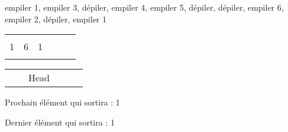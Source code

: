 \documentclass[11pt,a4paper]{article}
\begin{document}
\begin{center}

\begin{large}
empiler 1, empiler 3, dépiler, empiler 4, empiler 5, dépiler, dépiler, empiler 6, empiler 2, dépiler, empiler 1
\end{large}

\medskip

\begin{tabular}{|C{1cm}|C{1cm}|C{1cm}|C{1cm}|C{1cm}|C{1cm}|}
\hline
  &   &   &   &   & \\
1 & 6 & 1 &   &   & \\
  &   &   &   &   & \\
\hline
\end{tabular}

\begin{tabular}{ C{1cm} C{1cm} C{1cm} C{1cm} C{1cm} C{1cm} }
 & & Head & & & \\
\end{tabular}






\begin{table}[ht!]
  \begin{minipage}{0.50\textwidth}

Prochain élément qui sortira : 1

  \end{minipage}
  \hfillx
  \begin{minipage}{0.50\textwidth}

Dernier élément qui sortira : 1

  \end{minipage}
\end{table}
\end{center}

\bigskip
\bigskip
\end{document}
